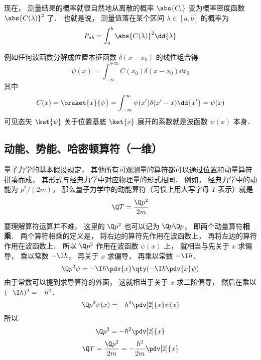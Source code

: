 现在， 测量结果的概率就很自然地从离散的概率 $\abs{C_i}$ 变为概率密度函数 $\abs{C(\lambda)}^2$ 了． 也就是说， 测量值落在某个区间 $\lambda \in [a, b]$ 的概率为
\begin{equation}
P_{ab} = \int_a^b \abs{C(\lambda)}^2 \dd{\lambda}
\end{equation}

例如任何波函数分解成位置本征函数 $\delta(x-x_0)$ 的线性组合得
\begin{equation}
\psi(x) = \int_{-\infty}^{+\infty} C(x_0) \delta(x - x_0) \dd{x_0}
\end{equation}
其中
\begin{equation}
C(x) = \braket{x}{\psi} = \int_{-\infty}^\infty \psi(x')\delta(x'-x)\dd{x'} = \psi(x)
\end{equation}
可见态矢 $\ket{\psi}$ 关于位置基底 $\ket{x}$ 展开的系数就是波函数 $\psi(x)$ 本身．

\subsection{动能、势能、哈密顿算符（一维）}
量子力学的基本假设规定， 其他所有可观测量的算符都可以通过位置和动量算符拼凑而成， 其形式与经典力学中对应物理量的形式相同． 例如， 经典力学中的动能为 $p^2/(2m)$， 那么量子力学中的动能算符（习惯上用大写字母 $T$ 表示）就是
\begin{equation}\label{QM1_eq1}
\Q T = \frac{\Q p^2}{2m}
\end{equation}

要理解算符运算并不难， 这里的 $\Q p^2$ 也可以记为 $\Q p \Q p$， 即两个动量算符\textbf{相乘}． 两个算符相乘的定义是， 将右边的算符先作用在波函数上， 再将左边的算符作用在波函数上． 所以 $\Q p^2$ 作用在波函数 $\psi(x)$ 上， 就相当与先关于 $x$ 求偏导， 乘以常数 $-\I \hbar$， 再关于 $x$ 求偏导， 再乘以常数 $-\I \hbar$．
\begin{equation}
\Q p^2 \psi = -\I \hbar\pdv{x} \qty(-\I \hbar\pdv{x} \psi)
\end{equation}
由于常数可以提到求导算符的外面， 这就相当于关于 $x$ 求二阶偏导， 然后在乘以 $(-\I \hbar)^2 = -\hbar^2$．
\begin{equation}
\Q p^2 \psi(x) =  -\hbar^2 \pdv[2]{x} \psi(x)
\end{equation}
所以
\begin{equation}
\Q p^2 =  -\hbar^2 \pdv[2]{x}
\end{equation}
\begin{equation}
\Q T = \frac{\Q p^2}{2m} = -\frac{\hbar^2}{2m} \pdv[2]{x}
\end{equation}

